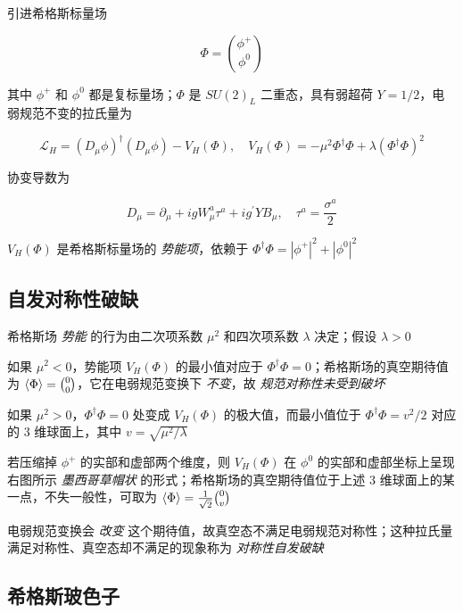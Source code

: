 引进希格斯标量场

\begin{equation}
    \Phi = \binom{\phi^+}{\phi^0}
\end{equation}

其中 $\phi^+$ 和 $\phi^0$ 都是复标量场；$\Phi$ 是 $SU(2)_L$ 二重态，具有弱超荷 $Y=1/2$，电弱规范不变的拉氏量为

\begin{equation}
    \mathcal{L}_H = (D_\mu \phi)^\dagger (D_\mu \phi) - V_H(\Phi), \quad V_H(\Phi) = -\mu^2 \Phi^\dagger \Phi + \lambda (\Phi^\dagger \Phi)^2
\end{equation}

协变导数为

\begin{equation}
    D_\mu = \partial_\mu + ig W_\mu^a \tau^a + ig^\prime Y B_\mu, \quad \tau^a = \frac{\sigma^a}{2}
\end{equation}

$V_H(\Phi)$ 是希格斯标量场的 \emph{势能项}，依赖于 $\Phi^\dagger \Phi = |\phi^+|^2 + |\phi^0|^2$

\subsection{自发对称性破缺}

希格斯场 \emph{势能} 的行为由二次项系数 $\mu^2$ 和四次项系数 $\lambda$ 决定；假设 $\lambda > 0$

如果 $\mu^2 < 0$，势能项 $V_H(\Phi)$ 的最小值对应于 $\Phi^\dagger \Phi = 0$；希格斯场的真空期待值为 $\Braket{\Phi} = \binom{0}{0}$，它在电弱规范变换下 \emph{不变}，故 \emph{规范对称性未受到破坏}

如果 $\mu^2 > 0$，$\Phi^\dagger \Phi = 0$ 处变成 $V_H(\Phi)$ 的极大值，而最小值位于 $\Phi^\dagger \Phi = v^2/2$ 对应的 $3$ 维球面上，其中 $v = \sqrt{\mu^2/\lambda}$

若压缩掉 $\phi^+$ 的实部和虚部两个维度，则 $V_H(\Phi)$ 在 $\phi^0$ 的实部和虚部坐标上呈现右图所示 \emph{墨西哥草帽状} 的形式；希格斯场的真空期待值位于上述 $3$ 维球面上的某一点，不失一般性，可取为 $\Braket{\Phi} = \frac{1}{\sqrt{2}} \binom{0}{v}$

电弱规范变换会 \emph{改变} 这个期待值，故真空态不满足电弱规范对称性；这种拉氏量满足对称性、真空态却不满足的现象称为 \emph{对称性自发破缺}

\subsection{希格斯玻色子}


